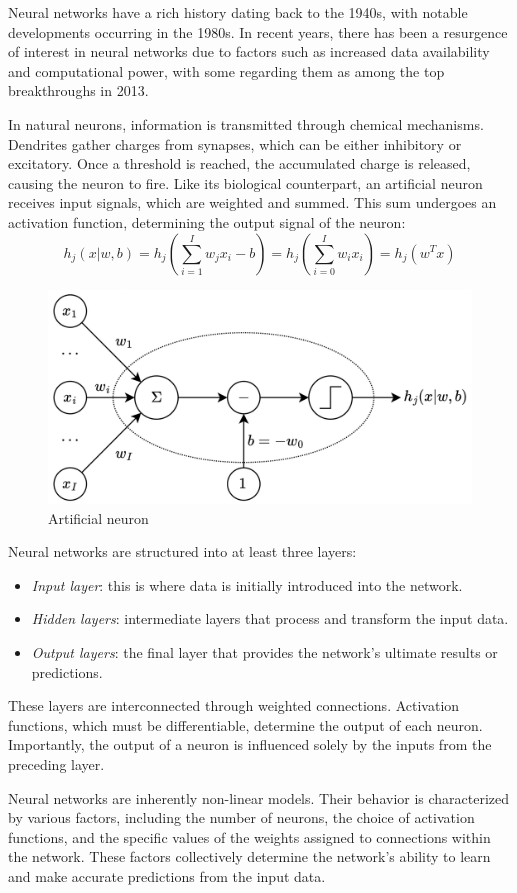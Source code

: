 Neural networks have a rich history dating back to the 1940s, with notable developments occurring in the 1980s. 
In recent years, there has been a resurgence of interest in neural networks due to factors such as increased data availability and computational power, with some regarding them as among the top breakthroughs in 2013.

In natural neurons, information is transmitted through chemical mechanisms. 
Dendrites gather charges from synapses, which can be either inhibitory or excitatory. 
Once a threshold is reached, the accumulated charge is released, causing the neuron to fire.
Like its biological counterpart, an artificial neuron receives input signals, which are weighted and summed. 
This sum undergoes an activation function, determining the output signal of the neuron: 
\[h_j(x|w,b)=h_j\left(\sum_{i=1}^{I}w_jx_i-b\right)=h_j\left( \sum_{i=0}^{I}w_ix_i \right)=h_j\left(w^Tx\right)\]
\begin{figure}[H]
    \centering
    \includegraphics[width=0.5\linewidth]{images/neuron.png}
    \caption{Artificial neuron}
\end{figure}
Neural networks are structured into at least three layers:
\begin{itemize}
    \item \textit{Input layer}: this is where data is initially introduced into the network.
    \item \textit{Hidden layers}: intermediate layers that process and transform the input data.
    \item \textit{Output layers}: the final layer that provides the network's ultimate results or predictions.
\end{itemize}
These layers are interconnected through weighted connections. 
Activation functions, which must be differentiable, determine the output of each neuron. 
Importantly, the output of a neuron is influenced solely by the inputs from the preceding layer.

Neural networks are inherently non-linear models. 
Their behavior is characterized by various factors, including the number of neurons, the choice of activation functions, and the specific values of the weights assigned to connections within the network. 
These factors collectively determine the network's ability to learn and make accurate predictions from the input data.

